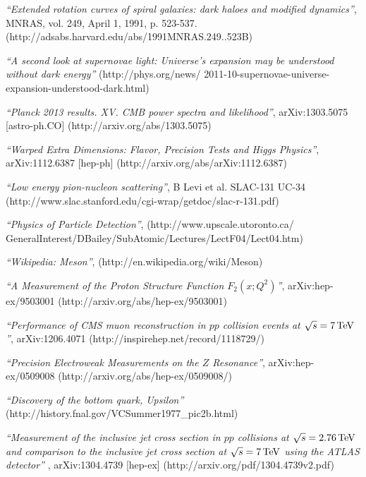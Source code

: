 
\begin{thebibliography}{999}
   \textit{``Extended rotation curves of spiral galaxies: dark haloes and modified dynamics''}, MNRAS, vol. 249, April 1, 1991, p. 523-537. (http://adsabs.harvard.edu/abs/1991MNRAS.249..523B)

   \textit{``A second look at supernovae light: Universe's expansion may be understood without dark energy''} (http://phys.org/news/ 2011-10-supernovae-universe-expansion-understood-dark.html)

   \textit{``Planck 2013 results. XV. CMB power spectra and likelihood''}, arXiv:1303.5075 [astro-ph.CO] (http://arxiv.org/abs/1303.5075)

   \textit{``Warped Extra Dimensions: Flavor, Precision Tests and Higgs Physics''}, 	arXiv:1112.6387 [hep-ph] (http://arxiv.org/abs/arXiv:1112.6387)
  
   \textit{``Low energy pion-nucleon scattering''}, B Levi et al. SLAC-131 UC-34 (http://www.slac.stanford.edu/cgi-wrap/getdoc/slac-r-131.pdf)
  
   \textit{``Physics of Particle Detection''}, (http://www.upscale.utoronto.ca/ GeneralInterest/DBailey/SubAtomic/Lectures/LectF04/Lect04.htm)

   \textit{``Wikipedia: Meson''}, (http://en.wikipedia.org/wiki/Meson)
  
   \textit{``A Measurement of the Proton Structure Function $F_2(x; Q^2)$''}, arXiv:hep-ex/9503001 (http://arxiv.org/abs/hep-ex/9503001)
  
   \textit{``Performance of CMS muon reconstruction in $pp$ collision events at $\sqrt{s} = 7 \mathrm{\,TeV}$''}, arXiv:1206.4071 (http://inspirehep.net/record/1118729/)
  
   \textit{``Precision Electroweak Measurements on the $Z$ Resonance''}, arXiv:hep-ex/0509008  (http://arxiv.org/abs/hep-ex/0509008/)
  
   \textit{``Discovery of the bottom quark, Upsilon''} (http://history.fnal.gov/VCSummer1977\_pic2b.html)
  
   \textit{``Measurement of the inclusive jet cross section in $pp$ collisions at $\sqrt{s}=2.76 \mathrm{\,TeV}$ and comparison to the inclusive jet cross section at $\sqrt{s}=7 \mathrm{\,TeV}$ using the ATLAS detector''} , 	arXiv:1304.4739 [hep-ex] (http://arxiv.org/pdf/1304.4739v2.pdf)
  
\end{thebibliography}
